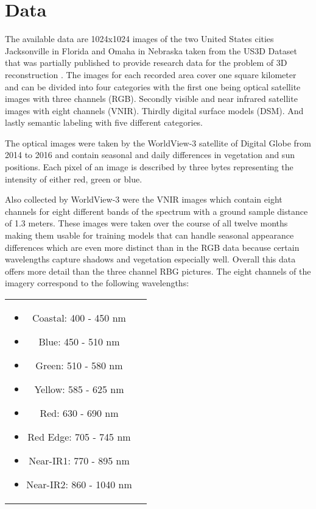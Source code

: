 \section{Data}

The available data are 1024x1024 images of the two United States cities Jacksonville
in Florida and Omaha in Nebraska taken from the US3D Dataset that
was partially published to provide research data for the problem
of 3D reconstruction \parencite{2019-bosch-semantic}.
The images for each recorded area cover one square kilometer and can be divided 
into four categories with the first one being optical satellite images with three channels (RGB). 
Secondly visible and near infrared satellite images with eight channels (VNIR). 
Thirdly digital surface models (DSM). And lastly semantic labeling with five different categories.
\medskip

The optical images were taken by the WorldView-3 satellite of Digital Globe from 2014 to 2016
and contain seasonal and daily differences in vegetation and sun positions. 
Each pixel of an image is described by three bytes representing the intensity of either red, green or blue.

Also collected by WorldView-3 were the VNIR images which contain eight channels for eight different bands of the spectrum with a ground sample distance of 1.3 meters. These images were taken over the course of all twelve months making them usable for training models that can handle seasonal appearance differences which are even more distinct than in the RGB data because certain wavelengths capture shadows and vegetation especially well. Overall this data offers more detail than the three channel RBG pictures. The eight channels of the imagery correspond to the following wavelengths:

\begin{tabular} {c c}
    \parbox{5cm}{
    \begin{itemize}
        \item Coastal: 400 - 450 nm 			
        \item Blue: 450 - 510 nm			
        \item Green: 510 - 580 nm 			
        \item Yellow: 585 - 625 nm
    \end{itemize}
    }
    \parbox{5cm}{
        \begin{itemize} 			
        \item Red: 630 - 690 nm
        \item Red Edge: 705 - 745 nm
        \item Near-IR1: 770 - 895 nm
        \item Near-IR2: 860 - 1040 nm
    \end{itemize}
    }
\end{tabular}
\bigskip

